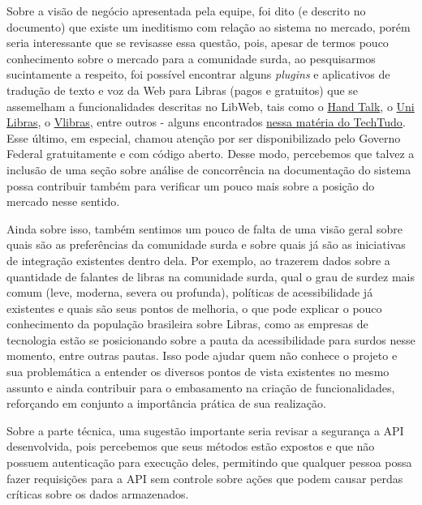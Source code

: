 Sobre a visão de negócio apresentada pela equipe, foi dito (e descrito no documento) que existe um ineditismo com relação ao sistema no mercado, porém seria interessante que se revisasse essa questão, pois, apesar de termos pouco conhecimento sobre o mercado para a comunidade surda, ao pesquisarmos sucintamente a respeito, foi possível encontrar alguns \textsl{plugins} e aplicativos de tradução de texto e voz da Web para Libras (pagos e gratuitos) que se assemelham a funcionalidades descritas no LibWeb, tais como o \href{https://www.handtalk.me/br/aplicativo/)}{Hand Talk}, o \href{https://lacom.ag/plicativo-uni-libras-e-a-comunicacao-com-o-deficiente-auditivo/)}{Uni Libras}, o \href{https://www.gov.br/governodigital/pt-br/vlibras/}{Vlibras}, entre outros - alguns encontrados \href{https://www.techtudo.com.br/noticias/2016/01/tradutor-de-libras-5-programas-e-sites-que-podem-ajudar-conversar.ghtml}{nessa matéria do TechTudo}. Esse último, em especial, chamou atenção por ser disponibilizado pelo Governo Federal gratuitamente e com código aberto. Desse modo, percebemos que talvez a inclusão de uma seção sobre análise de concorrência na documentação do sistema possa contribuir também para verificar um pouco mais sobre a posição do mercado nesse sentido.

Ainda sobre isso, também sentimos um pouco de falta de uma visão geral sobre quais são as preferências da comunidade surda e sobre quais já são as iniciativas de integração existentes dentro dela. Por exemplo, ao trazerem dados sobre a quantidade de falantes de libras na comunidade surda, qual o grau de surdez mais comum (leve, moderna, severa ou profunda), políticas de acessibilidade já existentes e quais são seus pontos de melhoria, o que pode explicar o pouco conhecimento da população brasileira sobre Libras, como as empresas de tecnologia estão se posicionando sobre a pauta da acessibilidade para surdos nesse momento, entre outras pautas. Isso pode ajudar quem não conhece o projeto e sua problemática a entender os diversos pontos de vista existentes no mesmo assunto e ainda contribuir para o embasamento na criação de funcionalidades, reforçando em conjunto a importância prática de sua realização.

Sobre a parte técnica, uma sugestão importante seria revisar a segurança a API desenvolvida, pois percebemos que seus métodos estão expostos e que não possuem autenticação para execução deles, permitindo que qualquer pessoa possa fazer requisições para a API sem controle sobre ações que podem causar perdas críticas sobre os dados armazenados.

